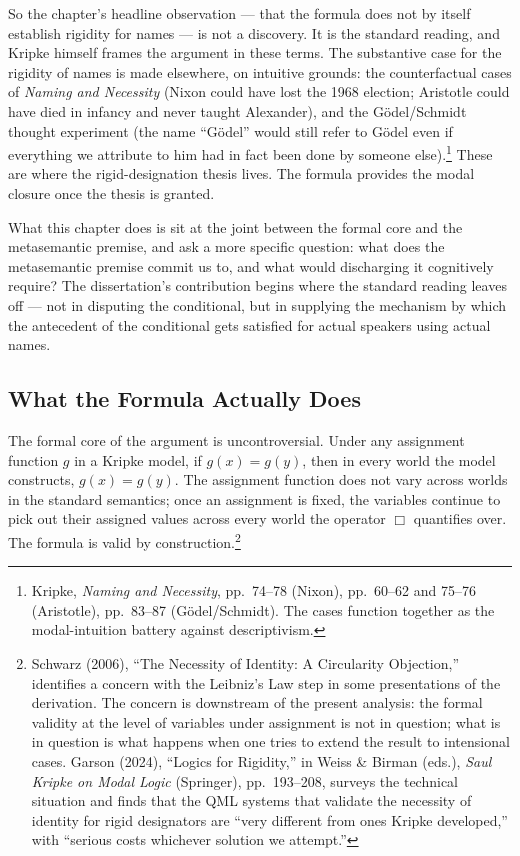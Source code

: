 \documentclass[10pt]{article}
\begin{document}
So the chapter's headline observation --- that the formula does not by itself establish rigidity for names --- is not a discovery. It is the standard reading, and Kripke himself frames the argument in these terms. The substantive case for the rigidity of names is made elsewhere, on intuitive grounds: the counterfactual cases of \emph{Naming and Necessity} (Nixon could have lost the 1968 election; Aristotle could have died in infancy and never taught Alexander), and the Gödel/Schmidt thought experiment (the name ``Gödel'' would still refer to Gödel even if everything we attribute to him had in fact been done by someone else).\footnote{Kripke, \emph{Naming and Necessity}, pp.~74--78 (Nixon), pp.~60--62 and 75--76 (Aristotle), pp.~83--87 (Gödel/Schmidt). The cases function together as the modal-intuition battery against descriptivism.} These are where the rigid-designation thesis lives. The formula provides the modal closure once the thesis is granted.

What this chapter does is sit at the joint between the formal core and the metasemantic premise, and ask a more specific question: what does the metasemantic premise commit us to, and what would discharging it cognitively require? The dissertation's contribution begins where the standard reading leaves off --- not in disputing the conditional, but in supplying the mechanism by which the antecedent of the conditional gets satisfied for actual speakers using actual names.

\subsection{What the Formula Actually Does}\label{what-the-formula-actually-does}

The formal core of the argument is uncontroversial. Under any assignment function \(g\) in a Kripke model, if \(g(x) = g(y)\), then in every world the model constructs, \(g(x) = g(y)\). The assignment function does not vary across worlds in the standard semantics; once an assignment is fixed, the variables continue to pick out their assigned values across every world the operator \(\Box\) quantifies over. The formula is valid by construction.\footnote{Schwarz (2006), ``The Necessity of Identity: A Circularity Objection,'' identifies a concern with the Leibniz's Law step in some presentations of the derivation. The concern is downstream of the present analysis: the formal validity at the level of variables under assignment is not in question; what is in question is what happens when one tries to extend the result to intensional cases. Garson (2024), ``Logics for Rigidity,'' in Weiss \& Birman (eds.), \emph{Saul Kripke on Modal Logic} (Springer), pp.~193--208, surveys the technical situation and finds that the QML systems that validate the necessity of identity for rigid designators are ``very different from ones Kripke developed,'' with ``serious costs whichever solution we attempt.''}
\end{document}
